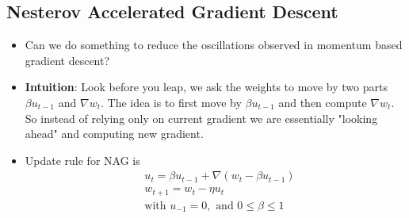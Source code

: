\documentclass[a4paper]{article}
\begin{document}
\subsection{Nesterov Accelerated Gradient Descent}
\begin{itemize}
    \item Can we do something to reduce the oscillations observed in momentum based gradient descent?
    \item \textbf{Intuition}: Look before you leap, we ask the weights to move by two parts $\beta u_{t-1}$ and $\nabla w_t$. The idea is to first move by $\beta u_{t-1}$ and then compute $\nabla w_t$. So instead of relying only on current gradient we are essentially "looking ahead" and computing new gradient.
    \item Update rule for NAG is
    \begin{equation*}
        \begin{split}
            &u_t = \beta u_{t-1} + \nabla (w_t-\beta u_{t-1})\\
            &w_{t+1} = w_t - \eta u_t\\
            &\text{with }u_{-1}=0,\text{ and }0\leq \beta \leq 1
        \end{split}
    \end{equation*}
\end{itemize}
\end{document}
